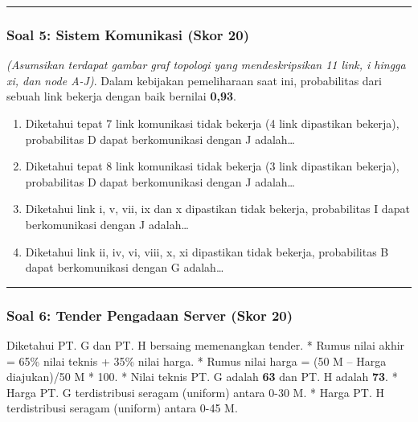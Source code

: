 \documentclass[
  letterpaper,
  DIV=11,
  numbers=noendperiod]{scrartcl}
\providecommand{\tightlist}{%
  \setlength{\itemsep}{0pt}\setlength{\parskip}{0pt}}
\begin{document}
\begin{center}\rule{0.5\linewidth}{0.5pt}\end{center}

\subsubsection{\texorpdfstring{\textbf{Soal 5: Sistem Komunikasi (Skor
20)}}{Soal 5: Sistem Komunikasi (Skor 20)}}\label{soal-5-sistem-komunikasi-skor-20}

\emph{(Asumsikan terdapat gambar graf topologi yang mendeskripsikan 11
link, i hingga xi, dan node A-J)}. Dalam kebijakan pemeliharaan saat
ini, probabilitas dari sebuah link bekerja dengan baik bernilai
\textbf{0,93}.

\begin{enumerate}
\def\labelenumi{\alph{enumi}.}
\tightlist
\item
  Diketahui tepat 7 link komunikasi tidak bekerja (4 link dipastikan
  bekerja), probabilitas D dapat berkomunikasi dengan J adalah\ldots{}
\item
  Diketahui tepat 8 link komunikasi tidak bekerja (3 link dipastikan
  bekerja), probabilitas D dapat berkomunikasi dengan J adalah\ldots{}
\item
  Diketahui link i, v, vii, ix dan x dipastikan tidak bekerja,
  probabilitas I dapat berkomunikasi dengan J adalah\ldots{}
\item
  Diketahui link ii, iv, vi, viii, x, xi dipastikan tidak bekerja,
  probabilitas B dapat berkomunikasi dengan G adalah\ldots{}
\end{enumerate}

\begin{center}\rule{0.5\linewidth}{0.5pt}\end{center}

\subsubsection{\texorpdfstring{\textbf{Soal 6: Tender Pengadaan Server
(Skor
20)}}{Soal 6: Tender Pengadaan Server (Skor 20)}}\label{soal-6-tender-pengadaan-server-skor-20}

Diketahui PT. G dan PT. H bersaing memenangkan tender. * Rumus nilai
akhir = 65\% nilai teknis + 35\% nilai harga. * Rumus nilai harga = (50
M -- Harga diajukan)/50 M * 100. * Nilai teknis PT. G adalah \textbf{63}
dan PT. H adalah \textbf{73}. * Harga PT. G terdistribusi seragam
(uniform) antara 0-30 M. * Harga PT. H terdistribusi seragam (uniform)
antara 0-45 M.
\end{document}
